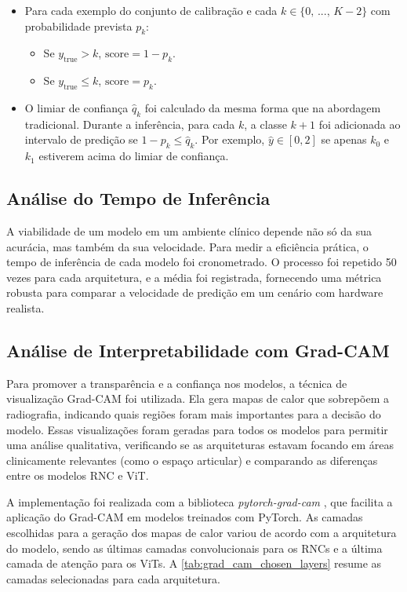 \begin{itemize}
    \item Para cada exemplo do conjunto de calibração e cada $k \in \lbrace 0 \text{, } ... \text{, } K-2 \rbrace$ com probabilidade prevista $p_k$:
        \begin{itemize}
            \item Se $y_{\text{true}} > k$, $\text{score} = 1 - p_k$.
            \item Se $y_{\text{true}} \leq k$, $\text{score} = p_k$.
        \end{itemize}
    \item O limiar de confiança $\hat{q}_k$ foi calculado da mesma forma que na abordagem tradicional. Durante a inferência, para cada $k$, a classe $k+1$ foi adicionada ao intervalo de predição se $1 - p_k \leq \hat{q}_k$. Por exemplo, $\hat{y} \in [0,2]$ se apenas $k_0$ e $k_1$ estiverem acima do limiar de confiança.
\end{itemize}

\subsection{Análise do Tempo de Inferência}

A viabilidade de um modelo em um ambiente clínico depende não só da sua acurácia, mas também da sua velocidade. Para medir a eficiência prática, o tempo de inferência de cada modelo foi cronometrado. O processo foi repetido 50 vezes para cada arquitetura, e a média foi registrada, fornecendo uma métrica robusta para comparar a velocidade de predição em um cenário com hardware realista.

\subsection{Análise de Interpretabilidade com Grad-CAM}

Para promover a transparência e a confiança nos modelos, a técnica de visualização Grad-CAM foi utilizada. Ela gera mapas de calor que sobrepõem a radiografia, indicando quais regiões foram mais importantes para a decisão do modelo. Essas visualizações foram geradas para todos os modelos para permitir uma análise qualitativa, verificando se as arquiteturas estavam focando em áreas clinicamente relevantes (como o espaço articular) e comparando as diferenças entre os modelos RNC e ViT.

A implementação foi realizada com a biblioteca \textit{pytorch-grad-cam} \cite{jacobgilpytorchcam}, que facilita a aplicação do Grad-CAM em modelos treinados com PyTorch. As camadas escolhidas para a geração dos mapas de calor variou de acordo com a arquitetura do modelo, sendo as últimas camadas convolucionais para os RNCs e a última camada de atenção para os ViTs. A \autoref{tab:grad_cam_chosen_layers} resume as camadas selecionadas para cada arquitetura.

